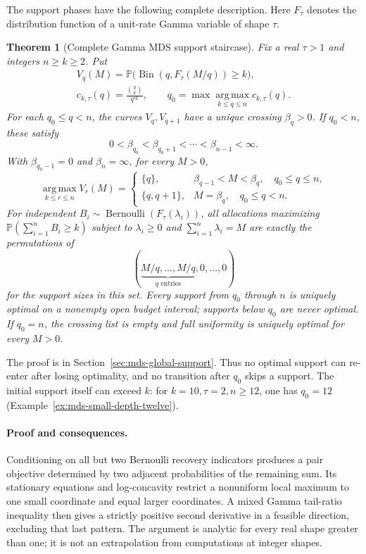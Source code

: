\documentclass[11pt]{article}
\newtheorem{theorem}{Theorem}[section]
\theoremstyle{definition}
\theoremstyle{remark}
\DeclareMathOperator{\Bernoulli}{Bernoulli}
\DeclareMathOperator{\Bin}{Bin}
\newcommand{\Pbb}{\mathbb P}
\newcommand{\1}{\mathbf 1}
\begin{document}
The support phases have the following complete description. Here
\(F_\tau\) denotes the distribution function of a unit-rate Gamma
variable of shape \(\tau\).

\newpage
\begin{theorem}[Complete Gamma MDS support staircase]
\label{thm:mds-global-support-staircase}
Fix a real \(\tau>1\) and integers \(n\ge k\ge2\). Put
\begin{gather*}
 V_q(M)=\Pbb\bigl(\Bin(q,F_\tau(M/q))\ge k\bigr),\\
 c_{k,\tau}(q)=\frac{\binom qk}{q^{\tau k}},\qquad
 q_0=\max\operatorname*{arg\,max}_{k\le q\le n}c_{k,\tau}(q).
\end{gather*}
For each \(q_0\le q<n\), the curves \(V_q,V_{q+1}\) have a unique
crossing \(\beta_q>0\). If \(q_0<n\), these satisfy
\[
 0<\beta_{q_0}<\beta_{q_0+1}<\cdots<\beta_{n-1}<\infty.
\]
With \(\beta_{q_0-1}=0\) and \(\beta_n=\infty\), for every \(M>0\),
\[
 \operatorname*{arg\,max}_{k\le r\le n}V_r(M)=
 \begin{cases}
 \{q\},&\beta_{q-1}<M<\beta_q,\quad q_0\le q\le n,\\
 \{q,q+1\},&M=\beta_q,\quad q_0\le q<n.
 \end{cases}
\]
For independent \(B_i\sim\Bernoulli(F_\tau(\lambda_i))\), all
allocations maximizing \(\Pbb(\sum_{i=1}^n B_i\ge k)\) subject to
\(\lambda_i\ge0\) and \(\sum_{i=1}^n\lambda_i=M\) are exactly the
permutations of
\[
 (\underbrace{M/q,\ldots,M/q}_{q\text{ entries}},0,\ldots,0)
\]
for the support sizes in this set. Every support from \(q_0\) through
\(n\) is uniquely optimal on a nonempty open budget interval; supports
below \(q_0\) are never optimal. If \(q_0=n\), the crossing list is
empty and full uniformity is uniquely optimal for every \(M>0\).
\end{theorem}

The proof is in Section~\ref{sec:mds-global-support}. Thus no optimal
support can re-enter after losing optimality, and no transition after
\(q_0\) skips a support. The initial support itself can exceed \(k\):
for \(k=10,\tau=2,n\ge12\), one has \(q_0=12\)
(Example~\ref{ex:mds-small-depth-twelve}).

\paragraph{Proof and consequences.}
Conditioning on all but two Bernoulli recovery indicators produces a pair objective determined by two adjacent probabilities of the remaining sum. Its stationary equations and log-concavity restrict a nonuniform local maximum to one small coordinate and equal larger coordinates. A mixed Gamma tail-ratio inequality then gives a strictly positive second derivative in a feasible direction, excluding that last pattern. The argument is analytic for every real shape greater than one; it is not an extrapolation from computations at integer shapes.
\end{document}
